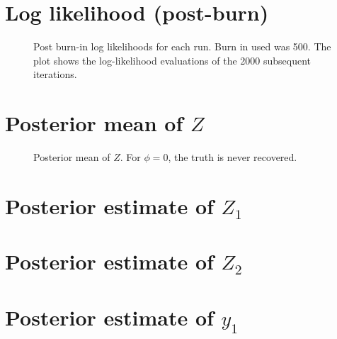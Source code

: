 \documentclass[10pt]{article} %
\begin{document}
\newpage
\section{Log likelihood (post-burn)}
\begin{figure}[H]
  \begin{center}  %
  \end{center}
  \caption{Post burn-in log likelihoods for each run. Burn in used was 500.
    The plot shows the log-likelihood evaluations of the 2000 subsequent
    iterations.}
  \label{fig:ll}
\end{figure}

\newpage
\section{Posterior mean of $Z$}
\begin{figure}[H]
  \begin{center}  %
  \end{center}
  \caption{Posterior mean of $Z$. For $\phi=0$, the truth is never recovered.}
  \label{fig:zmean}
\end{figure}
 
\newpage
\section{Posterior estimate of $Z_1$}
\begin{figure}[H]
  \begin{center}  %
  \end{center}
  \caption{}
  \label{fig:z1est}
\end{figure}

\newpage
\section{Posterior estimate of $Z_2$}
\begin{figure}[H]
  \begin{center}  %
  \end{center}
  \caption{}
  \label{fig:z2est}
\end{figure}

\newpage
\section{Posterior estimate of $y_1$}
\begin{figure}[H]
  \begin{center}  %
  \end{center}
  \caption{}
  \label{fig:y1est}
\end{figure}
\end{document}
